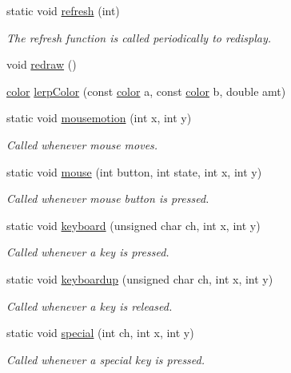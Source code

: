 \begin{DoxyCompactItemize}
\item 
static void \hyperlink{namespacecprocessing_a4edceb61c45d6bf384a38826469a5a48}{refresh} (int)
\begin{DoxyCompactList}\small\item\em \-The refresh function is called periodically to redisplay. \end{DoxyCompactList}\item 
void \hyperlink{namespacecprocessing_aefce387a356aa3e4937d4e08fc1b0b4c}{redraw} ()
\item 
\hyperlink{classcprocessing_1_1color}{color} \hyperlink{namespacecprocessing_ab84606ef8070ac7560a44acd6942517b}{lerp\-Color} (const \hyperlink{classcprocessing_1_1color}{color} a, const \hyperlink{classcprocessing_1_1color}{color} b, double amt)
\item 
static void \hyperlink{namespacecprocessing_a9fc04981955baab92e7b528b6a0c7c34}{mousemotion} (int x, int y)
\begin{DoxyCompactList}\small\item\em \-Called whenever mouse moves. \end{DoxyCompactList}\item 
static void \hyperlink{namespacecprocessing_abac12fcdd0efbbd1491a14011c381241}{mouse} (int button, int state, int x, int y)
\begin{DoxyCompactList}\small\item\em \-Called whenever mouse button is pressed. \end{DoxyCompactList}\item 
static void \hyperlink{namespacecprocessing_ae6eaa821ce4703a70ab13b0420bf2573}{keyboard} (unsigned char ch, int x, int y)
\begin{DoxyCompactList}\small\item\em \-Called whenever a key is pressed. \end{DoxyCompactList}\item 
static void \hyperlink{namespacecprocessing_ae4039b15e3caa11e48cb8d63e0f08977}{keyboardup} (unsigned char ch, int x, int y)
\begin{DoxyCompactList}\small\item\em \-Called whenever a key is released. \end{DoxyCompactList}\item 
static void \hyperlink{namespacecprocessing_a1b66644ad17ec9a36ff2b304d55f4b27}{special} (int ch, int x, int y)
\begin{DoxyCompactList}\small\item\em \-Called whenever a special key is pressed. \end{DoxyCompactList}\item 

\end{DoxyCompactItemize}
